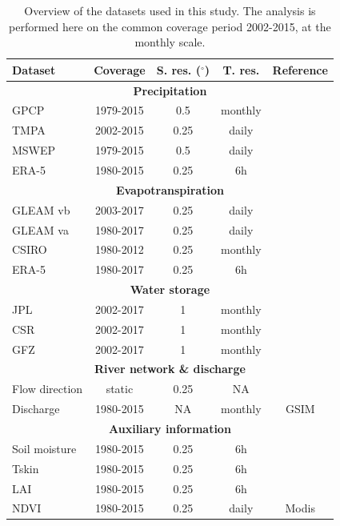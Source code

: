 \documentclass[draft]{agujournal2019}
\begin{document}
\begin{table}[h]
\centering
\begin{scriptsize}
\begin{tabular} {l c c c c}
\hline
Dataset & Coverage &  S. res. ($^\circ$)&  T. res.  & Reference \\
\hline 
\hline
\multicolumn{5}{c}{ \bf Precipitation} \\ 
\hline
GPCP & 1979-2015 &  0.5 & monthly & \cite{Beck2017} \\
\hline
TMPA & 2002-2015 &  0.25 & daily & \cite{Huffman2007} \\
\hline
MSWEP & 1979-2015 &  0.5 & daily  & \cite{Beck2017} \\
\hline
ERA-5 & 1980-2015 & 0.25 &6h & \cite{Hersbach2016} \\
\hline 
\hline 
\multicolumn{5}{c}{\bf Evapotranspiration}  \\ 
\hline 
GLEAM vb & 2003-2017 &  0.25& daily & \cite{Martens2016} \\
\hline 
GLEAM va & 1980-2017 &  0.25& daily & \cite{Martens2016} \\
\hline
CSIRO  & 1980-2012 & 0.25 & monthly &\cite{CSIRO2016}\\
\hline
ERA-5  & 1980-2017 & 0.25 &6h &\cite{Hersbach2016}\\
\hline
\hline 
\multicolumn{5}{c}{\bf Water storage}  \\ 
\hline
JPL & 2002-2017 &  1 & monthly &  \cite{Watkins}\\
\hline 
CSR & 2002-2017 &  1 & monthly &   \cite{Bettadpur2012}\\
\hline
GFZ & 2002-2017 &  1 & monthly &   \cite{Dahle2013}\\
\hline 
\hline 
\multicolumn{5}{c}{\bf River network \& discharge}\\ 
\hline 
Flow direction & static &  0.25 & NA & \cite{Yamazaki2019a} \\
\hline 
Discharge & 1980-2015 &  NA & monthly &  GSIM\\
\hline
\hline 
\multicolumn{5}{c}{\bf Auxiliary information}  \\ 
\hline 
Soil moisture & 1980-2015 &  0.25 & 6h &  \cite{Hersbach2016} \\
\hline
Tskin & 1980-2015 &  0.25 & 6h &  \cite{Hersbach2016}\\
\hline
LAI & 1980-2015  & 0.25 &6h & \cite{Hersbach2016} \\
\hline
NDVI & 1980-2015  & 0.25 & daily & Modis\\
\hline
\end{tabular}
\end{scriptsize}
\caption{Overview of the datasets used in this study. The analysis is performed here on the common coverage period 2002-2015, at the monthly scale.}
\label{table1}
\end{table}
\end{document}
